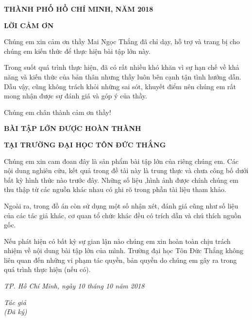 \documentclass{report}
\begin{document}
\vspace{1cm}
\changefontsizes{14pt}
\centerline{\textbf{THÀNH PHỐ HỒ CHÍ MINH, NĂM 2018}}


\newpage
\changefontsizes{16pt}
\centerline{\textbf{LỜI CẢM ƠN}}

\changefontsizes{13pt}
\bigskip
\setlength{\parindent}{2cm}

Chúng em xin cảm ơn thầy Mai Ngọc Thắng đã chỉ dạy, hỗ trợ và trang bị cho chúng em kiến thức để thực hiện bài tập lớn này.

Trong suốt quá trình thực hiện, đã có rất nhiều khó khăn vì sự hạn chế về khả năng và kiến thức của bản thân nhưng thầy luôn bên cạnh tận tình hướng dẫn. Dẫu vậy, cũng không trách khỏi những sai sót, khuyết điểm nên chúng em rất mong nhận được sự đánh giá và góp ý của thầy.

Chúng em chân thành cảm ơn thầy!
    
\newpage
\changefontsizes{16pt}
\centerline{\textbf{BÀI TẬP LỚN ĐƯỢC HOÀN THÀNH}}
\centerline{\textbf{TẠI TRƯỜNG ĐẠI HỌC TÔN ĐỨC THẮNG}}
\changefontsizes{13pt}
\vspace{1cm}
\setlength{\parindent}{2cm}
Chúng em xin cam đoan đây là sản phẩm bài tập lớn của riêng chúng em. Các nội dung nghiên cứu, kết quả trong đề tài này là trung thực và chưa công bố dưới bất kỳ hình thức nào trước đây. Những số liệu ,hình ảnh được chính chúng em thu thập từ các nguồn khác nhau có ghi rõ trong phần tài liệu tham khảo.

\setlength{\parindent}{2cm}
Ngoài ra, trong đồ án còn sử dụng một số nhận xét, đánh giá cũng như số liệu của các tác giả khác, cơ quan tổ chức khác đều có trích dẫn và chú thích nguồn gốc.

\setlength{\parindent}{2cm}
Nếu phát hiện có bất kỳ sự gian lận nào chúng em xin hoàn toàn chịu trách nhiệm về nội dung bài tập lớn của mình. Trường đại học Tôn Đức Thắng không liên quan đến những vi phạm tác quyền, bản quyền do chúng em gây ra trong quá trình thực hiện (nếu có).

\vspace{0.75cm}
\begin{flushright}
\renewcommand{\baselinestretch}{0.05}
\changefontsizes{13pt}
\textit{TP. Hồ Chí Minh, ngày 10 tháng 10 năm 2018}
\end{flushright}

\setlength{\parindent}{13cm}
\textit{Tác giả }\\

\setlength{\parindent}{13cm}
\textit{(Đã ký)}\\
\end{document}
